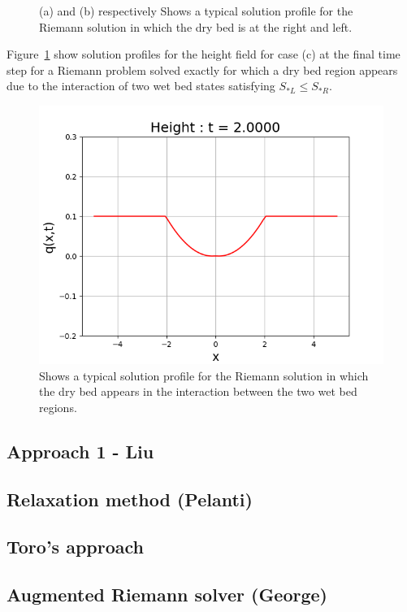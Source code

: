 \documentclass[12pt,a4paper]{article}
\begin{document}
{\begin{figure}[H]
\begin{subfigure}[b]{0.5\textwidth}
		\end{subfigure}
		\caption{(a) and (b) respectively Shows a typical solution profile for the Riemann solution in which the dry bed is at the right and left. }
	\end{figure}
	Figure~\ref{fig:middle} show solution profiles for the height field  for case (c) at the final time step for a Riemann problem  solved exactly for which a dry bed region appears due to the interaction of two wet bed states satisfying $S_{*L} \le S_{*R}$.
	\begin{figure}[H]
		\centering
		\includegraphics[width=0.8\linewidth]{images/middle}
		\caption{ Shows a typical solution profile for the Riemann solution in which the dry bed appears in the interaction between the two wet bed regions.}
		\label{fig:middle}
	\end{figure}
}  %



	\subsection{Approach 1 - Liu}

	\subsection{Relaxation method (Pelanti)}

	\subsection{Toro's approach}

	\subsection{Augmented Riemann solver (George)}
\end{document}
